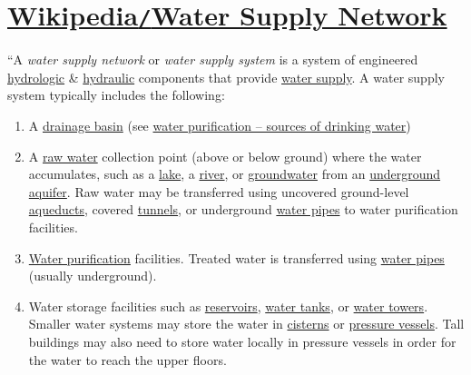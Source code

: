 \documentclass[oneside]{book}
\numberwithin{equation}{section}
\begin{document}

\section{\href{https://en.wikipedia.org/wiki/Water_supply_network}{Wikipedia\texttt{/}Water Supply Network}}
``A \textit{water supply network} or \textit{water supply system} is a system of engineered \href{https://en.wikipedia.org/wiki/Hydrologic}{hydrologic} \& \href{https://en.wikipedia.org/wiki/Hydraulic}{hydraulic} components that provide \href{https://en.wikipedia.org/wiki/Water_supply}{water supply}. A water supply system typically includes the following:
\begin{enumerate}
	\item A \href{https://en.wikipedia.org/wiki/Drainage_basin}{drainage basin} (see \href{https://en.wikipedia.org/wiki/Water_purification#Sources_of_drinking_water}{water purification -- sources of drinking water})
	\item A \href{https://en.wikipedia.org/wiki/Raw_water}{raw water} collection point (above or below ground) where the water accumulates, such as a \href{https://en.wikipedia.org/wiki/Lake}{lake}, a \href{https://en.wikipedia.org/wiki/River}{river}, or \href{https://en.wikipedia.org/wiki/Groundwater}{groundwater} from an \href{https://en.wikipedia.org/wiki/Underground_aquifer}{underground aquifer}. Raw water may be transferred using uncovered ground-level \href{https://en.wikipedia.org/wiki/Aqueduct_(watercourse)}{aqueducts}, covered \href{https://en.wikipedia.org/wiki/Tunnel}{tunnels}, or underground \href{https://en.wikipedia.org/wiki/Water_pipes}{water pipes} to water purification facilities.
	\item \href{https://en.wikipedia.org/wiki/Water_purification}{Water purification} facilities. Treated water is transferred using \href{https://en.wikipedia.org/wiki/Water_pipes}{water pipes} (usually underground).
	\item Water storage facilities such as \href{https://en.wikipedia.org/wiki/Reservoirs}{reservoirs}, \href{https://en.wikipedia.org/wiki/Water_tank}{water tanks}, or \href{https://en.wikipedia.org/wiki/Water_tower}{water towers}. Smaller water systems may store the water in \href{https://en.wikipedia.org/wiki/Cisterns}{cisterns} or \href{https://en.wikipedia.org/wiki/Pressure_vessel}{pressure vessels}. Tall buildings may also need to store water locally in pressure vessels in order for the water to reach the upper floors.

\end{enumerate}
\end{document}
